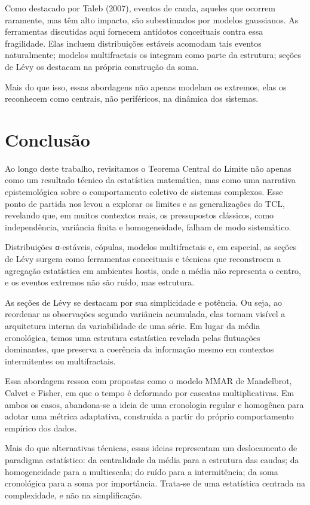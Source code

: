 \documentclass[
]{agujournal2019}
\begin{document}
Como destacado por Taleb (2007), eventos de cauda, aqueles que ocorrem
raramente, mas têm alto impacto, são subestimados por modelos
gaussianos. As ferramentas discutidas aqui fornecem antídotos
conceituais contra essa fragilidade. Elas incluem distribuições estáveis
acomodam tais eventos naturalmente; modelos multifractais os integram
como parte da estrutura; seções de Lévy os destacam na própria
construção da soma.

Mais do que isso, essas abordagens não apenas modelam os extremos, elas
os reconhecem como centrais, não periféricos, na dinâmica dos sistemas.

\section{Conclusão}\label{conclusuxe3o}

Ao longo deste trabalho, revisitamos o Teorema Central do Limite não
apenas como um resultado técnico da estatística matemática, mas como uma
narrativa epistemológica sobre o comportamento coletivo de sistemas
complexos. Esse ponto de partida nos levou a explorar os limites e as
generalizações do TCL, revelando que, em muitos contextos reais, os
pressupostos clássicos, como independência, variância finita e
homogeneidade, falham de modo sistemático.

Distribuições α-estáveis, cópulas, modelos multifractais e, em especial,
as seções de Lévy surgem como ferramentas conceituais e técnicas que
reconstroem a agregação estatística em ambientes hostis, onde a média
não representa o centro, e os eventos extremos não são ruído, mas
estrutura.

As seções de Lévy se destacam por sua simplicidade e potência. Ou seja,
ao reordenar as observações segundo variância acumulada, elas tornam
visível a arquitetura interna da variabilidade de uma série. Em lugar da
média cronológica, temos uma estrutura estatística revelada pelas
flutuações dominantes, que preserva a coerência da informação mesmo em
contextos intermitentes ou multifractais.

Essa abordagem ressoa com propostas como o modelo MMAR de Mandelbrot,
Calvet e Fisher, em que o tempo é deformado por cascatas
multiplicativas. Em ambos os casos, abandona-se a ideia de uma
cronologia regular e homogênea para adotar uma métrica adaptativa,
construída a partir do próprio comportamento empírico dos dados.

Mais do que alternativas técnicas, essas ideias representam um
deslocamento de paradigma estatístico: da centralidade da média para a
estrutura das caudas; da homogeneidade para a multiescala; do ruído para
a intermitência; da soma cronológica para a soma por importância.
Trata-se de uma estatística centrada na complexidade, e não na
simplificação.
\end{document}
